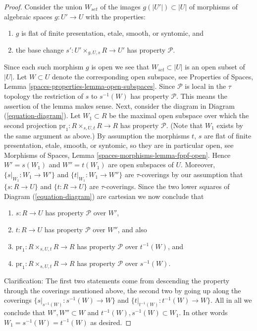 \begin{proof}
Consider the union $W_{set}$ of the images $g(|U'|) \subset |U|$ of
morphisms of algebraic spaces $g : U' \to U$ with the properties:
\begin{enumerate}
\item $g$ is flat of finite presentation, etale, smooth, or syntomic, and
\item the base change $s' : U' \times_{g, U, s} R \to U'$ has property
$\mathcal{P}$.
\end{enumerate}
Since each such morphism $g$ is open we see that $W_{set} \subset |U|$
is an open subset of $|U|$. Let $W \subset U$ denote the corresponding
open subspace, see
Properties of Spaces, Lemma \ref{spaces-properties-lemma-open-subspaces}.
Since $\mathcal{P}$ is local in the $\tau$ topology the
restriction of $s$ to $s^{-1}(W)$ has property $\mathcal{P}$.
This means the assertion of the lemma makes sense.
Next, consider the diagram in
Diagram (\ref{equation-diagram}).
Let $W_1 \subset R$ be the maximal open subspace over which the
second projection
$\text{pr}_1 : R \times_{s, U, t} R \to R$ has property $\mathcal{P}$.
(Note that $W_1$ exists by the same argument as above.)
By assumption the morphisms $t$, $s$ are
flat of finite presentation, etale, smooth, or syntomic, so they are
in particular open, see
Morphisms of Spaces, Lemma \ref{spaces-morphisms-lemma-fppf-open}.
Hence $W' = s(W_1)$ and $W'' = t(W_1)$ are open subspaces of $U$.
Moreover, $\{s|_{W_1} : W_1 \to W'\}$ and $\{t|_{W_1} : W_1 \to W''\}$
are $\tau$-coverings by our assumption that
$\{s : R \to U\}$ and $\{t : R \to U\}$ are $\tau$-coverings.
Since the two lower squares of 
Diagram (\ref{equation-diagram})
are cartesian we now conclude that
\begin{enumerate}
\item $s : R \to U$ has property $\mathcal{P}$ over $W'$,
\item $t : R \to U$ has property $\mathcal{P}$ over $W''$, and also
\item $\text{pr}_1 : R \times_{s, U, t} R \to R$ has property
$\mathcal{P}$ over $t^{-1}(W)$, and
\item $\text{pr}_1 : R \times_{s, U, t} R \to R$ has property
$\mathcal{P}$ over $s^{-1}(W)$.
\end{enumerate}
Clarification: The first two statements come from descending the property
through the coverings mentioned above, the second two by going up along the
coverings $\{s|_{s^{-1}(W)} : s^{-1}(W) \to W\}$ and
$\{t|_{t^{-1}(W)} : t^{-1}(W) \to W\}$.
All in all we conclude that
$W', W'' \subset W$ and $t^{-1}(W), s^{-1}(W) \subset W_1$. In other words
$W_1 = s^{-1}(W) = t^{-1}(W)$ as desired.
\end{proof}




